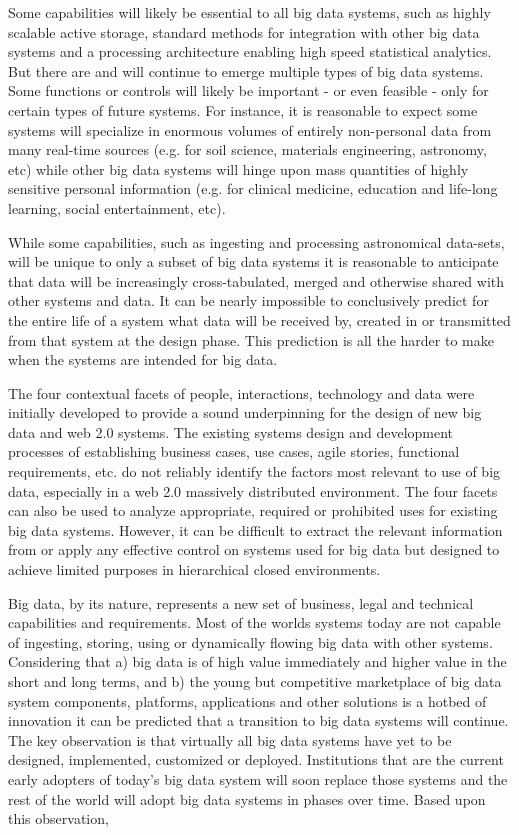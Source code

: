 Some capabilities will likely be essential to all big data systems, such as highly scalable active storage, standard methods for integration with other big data systems and a processing architecture enabling high speed statistical analytics. But there are and will continue to emerge multiple types of big data systems. Some functions or controls will likely be important - or even feasible - only for certain types of future systems. For instance, it is reasonable to expect some systems will specialize in enormous volumes of entirely non-personal data from many real-time sources (e.g. for soil science, materials engineering, astronomy, etc) while other big data systems will hinge upon mass quantities of highly sensitive personal information (e.g. for clinical medicine, education and life-long learning, social entertainment, etc).

While some capabilities, such as ingesting and processing astronomical data-sets, will be unique to only a subset of big data systems it is reasonable to anticipate that data will be increasingly cross-tabulated, merged and otherwise shared with other systems and data. It can be nearly impossible to conclusively predict for the entire life of a system what data will be received by, created in or transmitted from that system at the design phase. This prediction is all the harder to make when the systems are intended for big data.

The four contextual facets of people, interactions, technology and data were initially developed to provide a sound underpinning for the design of new big data and web 2.0 systems. The existing systems design and development processes of establishing business cases, use cases, agile stories, functional requirements, etc. do not reliably identify the factors most relevant to use of big data, especially in a web 2.0 massively distributed environment. The four facets can also be used to analyze appropriate, required or prohibited uses for existing big data systems. However, it can be difficult to extract the relevant information from or apply any effective control on systems used for big data but designed to achieve limited purposes in hierarchical closed environments.

Big data, by its nature, represents a new set of business, legal and technical capabilities and requirements. Most of the worlds systems today are not capable of ingesting, storing, using or dynamically flowing big data with other systems. Considering that a) big data is of high value immediately and higher value in the short and long terms, and b) the young but competitive marketplace of big data system components, platforms, applications and other solutions is a hotbed of innovation it can be predicted that a transition to big data systems will continue. The key observation is that virtually all big data systems have yet to be designed, implemented, customized or deployed. Institutions that are the current early adopters of today’s big data system will soon replace those systems and the rest of the world will adopt big data systems in phases over time. Based upon this observation,

